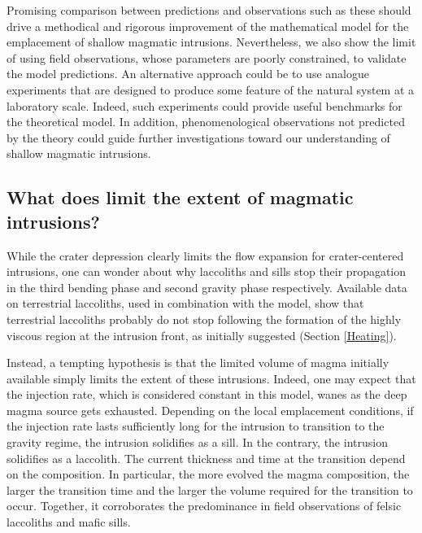 Promising  comparison between  predictions  and  observations such  as
these  should  drive a  methodical  and  rigorous improvement  of  the
mathematical model for the emplacement of shallow magmatic intrusions.
Nevertheless,  we also  show the  limit of  using field  observations,
whose  parameters  are  poorly  constrained,  to  validate  the  model
predictions.   An  alternative  approach  could  be  to  use  analogue
experiments that are  designed to produce some feature  of the natural
system at a  laboratory scale. Indeed, such  experiments could provide
useful   benchmarks  for   the   theoretical   model.   In   addition,
phenomenological observations not predicted  by the theory could guide
further investigations  toward our  understanding of  shallow magmatic
intrusions.

\subsection{What does limit the extent of magmatic intrusions?}
\label{sec:summary-2}

While  the crater  depression clearly  limits the  flow expansion  for
crater-centered intrusions,  one can  wonder about why  laccoliths and
sills stop  their propagation  in the third  bending phase  and second
gravity phase respectively. Available  data on terrestrial laccoliths,
used in combination  with the model, show  that terrestrial laccoliths
probably do  not stop  following the formation  of the  highly viscous
region  at  the  intrusion  front,  as  initially  suggested  (Section
\ref{Heating}).

Instead, a  tempting hypothesis  is that the  limited volume  of magma
initially   available    simply   limits    the   extent    of   these
intrusions. Indeed, one  may expect that the injection  rate, which is
considered constant in this model, wanes as the deep magma source gets
exhausted.  Depending  on the  local  emplacement  conditions, if  the
injection rate lasts sufficiently long for the intrusion to transition
to the  gravity regime,  the intrusion  solidifies as  a sill.  In the
contrary,  the  intrusion  solidifies  as  a  laccolith.  The  current
thickness and  time at  the transition depend  on the  composition. In
particular, the  more evolved  the magma  composition, the  larger the
transition time and the larger  the volume required for the transition
to  occur.  Together,  it   corroborates  the  predominance  in  field
observations of felsic laccoliths and mafic sills.

